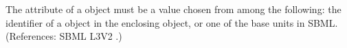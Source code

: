 The  attribute of a \Parameter object must be a value chosen
from among the following: the identifier of a \UnitDefinition object in the
enclosing \Model object, or one of the base units in SBML.  (References:
SBML L3V2 .)
